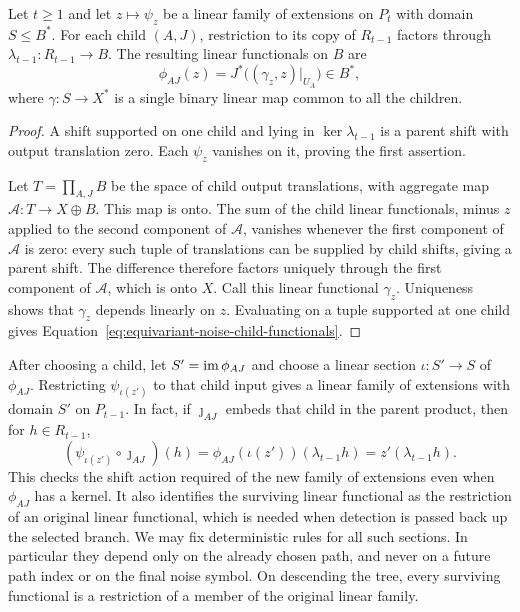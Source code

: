 \begin{lemma}\label{lem:equivariant-noise-extensions-factorization}
Let $t\ge1$ and let $z\mapsto\psi_z$ be a linear family of extensions on $P_t$ with
domain $S\le B^*$.  For each child $(A,J)$, restriction to its copy
of $R_{t-1}$ factors through $\lambda_{t-1}:R_{t-1}\to B$.
The resulting linear functionals on $B$ are
\begin{equation}\label{eq:equivariant-noise-child-functionals}
 \phi_{AJ}(z)=J^*\bigl((\gamma_z,z)|_{U_A}\bigr)\in B^*,
\end{equation}
where $\gamma:S\to X^*$ is a single binary linear map common to all the
children.
\end{lemma}

\begin{proof}
A shift supported on one child and lying in $\ker\lambda_{t-1}$ is a
parent shift with output translation zero.  Each $\psi_z$ vanishes on it,
proving the first assertion.

Let $T=\prod_{A,J}B$ be the space of child output translations, with aggregate
map $\mathcal A:T\to X\oplus B$.  This map is onto.  The sum of the
child linear functionals, minus $z$ applied to the second component of
$\mathcal A$, vanishes whenever the first component of $\mathcal A$ is
zero: every such tuple of translations can be supplied by child shifts,
giving a parent shift.  The difference therefore factors uniquely through the
first component of $\mathcal A$, which is onto $X$.  Call this linear functional
$\gamma_z$.  Uniqueness shows that $\gamma_z$ depends linearly on $z$.
Evaluating on a tuple supported at one child gives
Equation~\eqref{eq:equivariant-noise-child-functionals}.
\end{proof}

After choosing a child, let $S'=\operatorname{im}\phi_{AJ}$ and choose a linear section
$\iota:S'\to S$ of $\phi_{AJ}$.  Restricting $\psi_{\iota(z')}$ to that
child input gives a linear family of extensions with domain $S'$ on $P_{t-1}$.
In fact, if $\jmath_{AJ}$ embeds that child in the parent product, then
for $h\in R_{t-1}$,
\[
 (\psi_{\iota(z')}\circ\jmath_{AJ})(h)
 =\phi_{AJ}(\iota(z'))(\lambda_{t-1}h)
 =z'(\lambda_{t-1}h).
\]
This checks the shift action required of the new family of extensions even when
$\phi_{AJ}$ has a kernel.  It also identifies the surviving linear functional
as the restriction of an original linear functional, which is needed when
detection is passed back up the selected branch.
We may fix deterministic rules for all such sections.  In particular they
depend only on the already chosen path, and never on a future path index
or on the final noise symbol.  On descending the tree, every surviving
functional is a restriction of a member of the original linear family.


